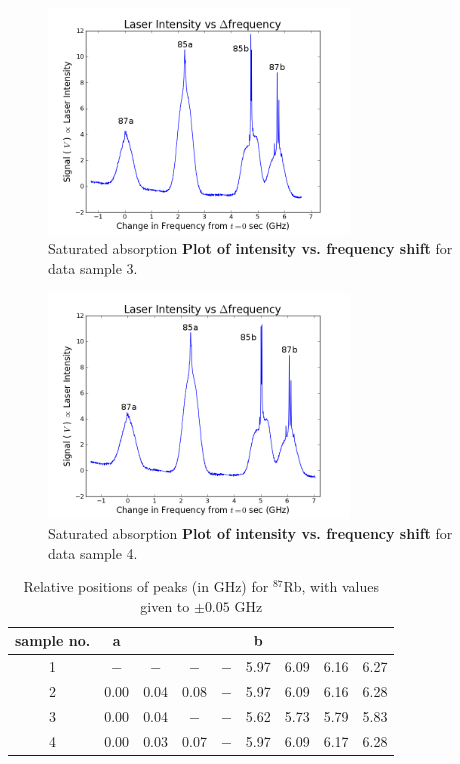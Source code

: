 \documentclass[paper=a4, fontsize=11pt]{scrartcl} %
\numberwithin{equation}{section}
\numberwithin{figure}{section}
\numberwithin{table}{section}
\begin{document}
\begin{figure}[H] \begin{center}
  \includegraphics[height=60mm]{4-2-011.png}
  \caption{Saturated absorption \textbf{Plot of intensity vs. frequency shift} for data sample 3. }
  \label{fig:scaled_3}
\end{center} \end{figure}

\begin{figure}[H] \begin{center}
  \includegraphics[height=60mm]{4-2-012.png}
  \caption{Saturated absorption \textbf{Plot of intensity vs. frequency shift}  for data sample 4. }
  \label{fig:scaled_4}
\end{center} \end{figure}

\begin{table}[H]
\centering
\caption{Relative positions of peaks (in GHz) for $^{87}$Rb, with values given to $\pm 0.05$ GHz}
\begin{tabular}{ c | c c c c | c c c c }
  \hline
  \hline
  sample no. & a & & & & b   \\
  \hline
  1 & $-$ & $-$ & $-$ & $-$ & 5.97 & 6.09 & 6.16 & 6.27 \\
  2 & 0.00 & 0.04 & 0.08 & $-$ & 5.97 & 6.09 & 6.16 & 6.28 \\
  3 & 0.00 & 0.04 & $-$ & $-$ & 5.62 & 5.73 & 5.79 & 5.83  \\
  4 & 0.00 & 0.03 & 0.07 & $-$ & 5.97 & 6.09 & 6.17 & 6.28
\end{tabular}
\label{table:relativePositions87}
\end{table}
\end{document}
